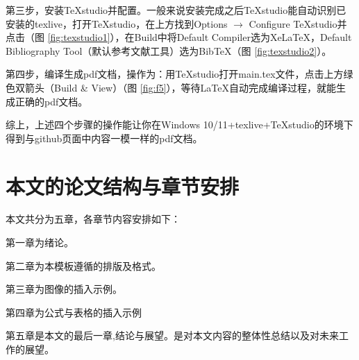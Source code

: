 第三步，安装TeXstudio并配置。一般来说安装完成之后TeXstudio能自动识别已安装的texlive，打开TeXstudio，在上方找到Options $\rightarrow$ Configure TeXstudio并点击（图 \ref{fig:texstudio1}），在Build中将Default Compiler选为XeLaTeX，Default Bibliography Tool（默认参考文献工具）选为BibTeX（图 \ref{fig:texstudio2}）。



第四步，编译生成pdf文档，操作为：用TeXstudio打开main.tex文件，点击上方绿色双箭头（Build \& View）（图 \ref{fig:f5}），等待LaTeX自动完成编译过程，就能生成正确的pdf文档。


综上，上述四个步骤的操作能让你在Windows 10/11+texlive+TeXstudio的环境下得到与github页面中内容一模一样的pdf文档。

\section{本文的论文结构与章节安排}
\label{sec:arrangement}
本文共分为五章，各章节内容安排如下：

第一章为绪论。

第二章为本模板遵循的排版及格式。

第三章为图像的插入示例。

第四章为公式与表格的插入示例

第五章是本文的最后一章,结论与展望。是对本文内容的整体性总结以及对未来工作的展望。

